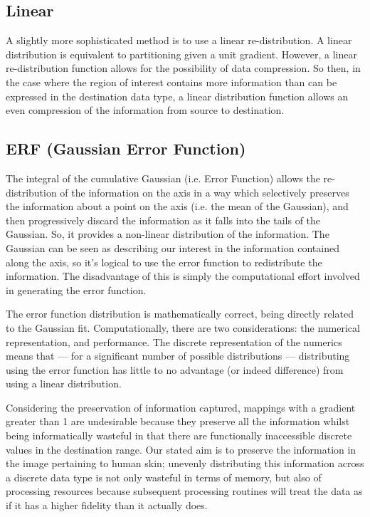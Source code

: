 \subsection{Linear}\label{sec:Linear}

A slightly more sophisticated method is to use a linear re-distribution. A linear distribution is equivalent to partitioning given a unit gradient. However, a linear re-distribution function allows for the possibility of data compression. So then, in the case where the region of interest contains more information than can be expressed in the destination data type, a linear distribution function allows an even compression of the information from source to destination. ~\cite{Lee2002}

\subsection{ERF (Gaussian Error Function)}\label{sec:ERF}

The integral of the cumulative Gaussian (i.e. Error Function) allows the re-distribution of the information on the axis in a way which selectively preserves the information about a point on the axis (i.e. the mean of the Gaussian), and then progressively discard the information as it falls into the tails of the Gaussian. So, it provides a non-linear distribution of the information. The Gaussian can be seen as describing our interest in the information contained along the axis, so it's logical to use the error function to redistribute the information. The disadvantage of this is simply the computational effort involved in generating the error function.

The error function distribution is mathematically correct, being directly related to the Gaussian fit. Computationally, there are two considerations: the numerical representation, and performance. The discrete representation of the numerics means that --- for a significant number of possible distributions --- distributing using the error function has little to no advantage (or indeed difference) from using a linear distribution.

Considering the preservation of information captured, mappings with a gradient greater than 1 are undesirable because they preserve all the information whilst being informatically wasteful in that there are functionally inaccessible discrete values in the destination range. Our stated aim is to preserve the information in the image pertaining to human skin; unevenly distributing this information across a discrete data type is not only wasteful in terms of memory, but also of processing resources because subsequent processing routines will treat the data as if it has a higher fidelity than it actually does.

